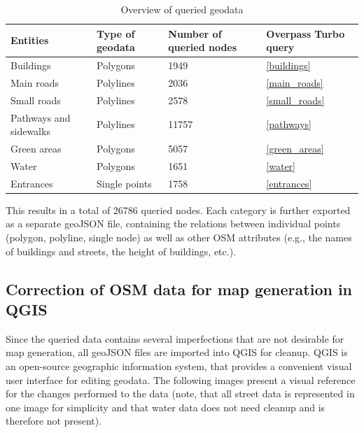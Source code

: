 \begin{table}[!ht]
	\small
	\centering
	\begin{tabular}{|l|l|l|l|}
		\hline
		\textbf{Entities}       & \textbf{Type of geodata}       & \textbf{Number of queried nodes}       & \textbf{Overpass Turbo query} \\
		\hline
        Buildings               & Polygons              & 1949                          & \ref{buildings} \\
		\hline
		Main roads              & Polylines             & 2036                          & \ref{main_roads} \\
		\hline
		Small roads             & Polylines             & 2578                          & \ref{small_roads} \\
		\hline
		Pathways and sidewalks  & Polylines             & 11757                         & \ref{pathways} \\
		\hline
        Green areas             & Polygons              & 5057                          & \ref{green_areas} \\
		\hline
        Water                   & Polygons              & 1651                          & \ref{water} \\
		\hline
        Entrances               & Single points         & 1758                          & \ref{entrances} \\
		\hline
	\end{tabular}
	\caption{Overview of queried geodata}
\end{table}

This results in a total of 26786 queried nodes. Each category is further exported as a separate geoJSON file, containing the relations between individual points (polygon, polyline, single node) as well as other OSM attributes (e.g., the names of buildings and streets, the height of buildings, etc.).

\subsection{Correction of OSM data for map generation in QGIS}
Since the queried data contains several imperfections that are not desirable for map generation, all geoJSON files are imported into QGIS for cleanup. QGIS is an open-source geographic information system, that provides a convenient visual user interface for editing geodata. The following images present a visual reference for the changes performed to the data (note, that all street data is represented in one image for simplicity and that water data does not need cleanup and is therefore not present).

